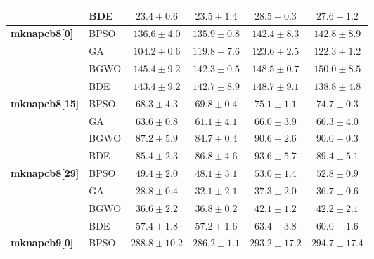 \begin{table}[htbp]
\begin{tabular*}{\textwidth}{@{\extracolsep{\fill}}llcccc@{}}
                       & BDE   &  $\mathbf{23.4 \pm 0.6}$ &           $23.5 \pm 1.4$ &           $28.5 \pm 0.3$ &           $27.6 \pm 1.2$ \\
    \midrule
    \textbf{mknapcb8[0]} & BPSO  &          $136.6 \pm 4.0$ & $\mathbf{135.9 \pm 0.8}$ &          $142.4 \pm 8.3$ &          $142.8 \pm 8.9$ \\
                       & GA    & $\mathbf{104.2 \pm 0.6}$ &          $119.8 \pm 7.6$ &          $123.6 \pm 2.5$ &          $122.3 \pm 1.2$ \\
                       & BGWO  &          $145.4 \pm 9.2$ & $\mathbf{142.3 \pm 0.5}$ &          $148.5 \pm 0.7$ &          $150.0 \pm 8.5$ \\
                       & BDE   &          $143.4 \pm 9.2$ &          $142.7 \pm 8.9$ &          $148.7 \pm 9.1$ & $\mathbf{138.8 \pm 4.8}$ \\
    \midrule
    \textbf{mknapcb8[15]} & BPSO  &  $\mathbf{68.3 \pm 4.3}$ &           $69.8 \pm 0.4$ &           $75.1 \pm 1.1$ &           $74.7 \pm 0.3$ \\
                       & GA    &           $63.6 \pm 0.8$ &  $\mathbf{61.1 \pm 4.1}$ &           $66.0 \pm 3.9$ &           $66.3 \pm 4.0$ \\
                       & BGWO  &           $87.2 \pm 5.9$ &  $\mathbf{84.7 \pm 0.4}$ &           $90.6 \pm 2.6$ &           $90.0 \pm 0.3$ \\
                       & BDE   &  $\mathbf{85.4 \pm 2.3}$ &           $86.8 \pm 4.6$ &           $93.6 \pm 5.7$ &           $89.4 \pm 5.1$ \\
    \midrule
    \textbf{mknapcb8[29]} & BPSO  &           $49.4 \pm 2.0$ &  $\mathbf{48.1 \pm 3.1}$ &           $53.0 \pm 1.4$ &           $52.8 \pm 0.9$ \\
                       & GA    &  $\mathbf{28.8 \pm 0.4}$ &           $32.1 \pm 2.1$ &           $37.3 \pm 2.0$ &           $36.7 \pm 0.6$ \\
                       & BGWO  &  $\mathbf{36.6 \pm 2.2}$ &           $36.8 \pm 0.2$ &           $42.1 \pm 1.2$ &           $42.2 \pm 2.1$ \\
                       & BDE   &           $57.4 \pm 1.8$ &  $\mathbf{57.2 \pm 1.6}$ &           $63.4 \pm 3.8$ &           $60.0 \pm 1.6$ \\
    \midrule
    \textbf{mknapcb9[0]} & BPSO  &         $288.8 \pm 10.2$ & $\mathbf{286.2 \pm 1.1}$ &         $293.2 \pm 17.2$ &         $294.7 \pm 17.4$ \\

\end{tabular*}
\end{table}
